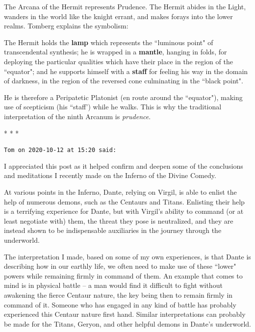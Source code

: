 The Arcana of the Hermit represents Prudence. The Hermit abides in the Light, wanders in the world like the knight
errant, and makes forays into the lower realms. Tomberg explains the symbolism:

\begin{quotex}
The Hermit holds the \textbf{lamp} which represents the ``luminous point" of transcendental synthesis; he is wrapped in a
\textbf{mantle}, hanging in folds, for deploying the particular qualities which have their place in the region of the
``equator"; and he supports himself with a \textbf{staff} for feeling his way in the domain of darkness, in the region
of the reversed cone culminating in the ``black point".

He is therefore a Peripatetic Platonist (en route around the ``equator"), making use of scepticism (his
``staff') while he walks. This is why the traditional interpretation of the ninth Arcanum is
\emph{prudence}.

\end{quotex}



\begin{center}* * *\end{center}

\begin{footnotesize}\begin{sffamily}



\texttt{Tom on 2020-10-12 at 15:20 said: }

I appreciated this post as it helped confirm and deepen some of the conclusions and meditations I recently made on the
Inferno of the Divine Comedy. 

At various points in the Inferno, Dante, relying on Virgil, is able to enlist the help of numerous demons, such as the
Centaurs and Titans. Enlisting their help is a terrifying experience for Dante, but with Virgil's
ability to command (or at least negotiate with) them, the threat they pose is neutralized, and they are instead shown
to be indispensable auxiliaries in the journey through the underworld.

The interpretation I made, based on some of my own experiences, is that Dante is describing how in our earthly life, we
often need to make use of these ``lower" powers while remaining firmly in command of them. An example that comes to mind
is in physical battle – a man would find it difficult to fight without awakening the fierce Centaur nature, the key
being then to remain firmly in command of it. Someone who has engaged in any kind of battle has probably experienced
this Centaur nature first hand. Similar interpretations can probably be made for the Titans, Geryon, and other helpful
demons in Dante's underworld.


\end{sffamily}\end{footnotesize}
